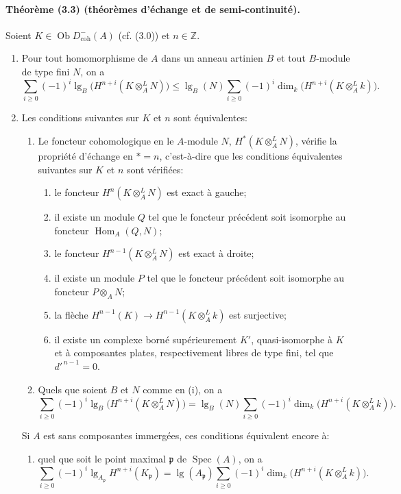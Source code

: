 \documentclass[10pt]{article}
\newcommand{\Z}{\mathbb Z}
\newcommand{\Hom}{\operatorname{Hom}}
\providecommand{\Spec}{\operatorname{Spec}}
\providecommand{\lgop}{\operatorname{lg}}
\providecommand{\Ob}{\operatorname{Ob}}
\begin{document}
\paragraph{Théorème (3.3) (théorèmes d'échange et de semi-continuité).} Soient $K\in\Ob D^-_{\mathrm{coh}}(A)$ (cf. (3.0)) et $n\in\Z$.
\begin{enumerate}[label=(\roman*)]
\item Pour tout homomorphisme de $A$ dans un anneau artinien $B$ et tout $B$-module de type fini $N$, on a
\[
\tag{3.3.1}
\sum_{i\ge0}(-1)^i\lgop_B\bigl(H^{n+i}(K\otimes_A^L N)\bigr)
\le
\lgop_B(N)\sum_{i\ge0}(-1)^i\dim_k\bigl(H^{n+i}(K\otimes_A^L k)\bigr).
\]
\item Les conditions suivantes sur $K$ et $n$ sont équivalentes:
\begin{enumerate}[label=\alph*)]
\item Le foncteur cohomologique en le $A$-module $N$, $H^*(K\otimes_A^L N)$, vérifie la propriété d'échange en $*=n$, c'est-à-dire que les conditions équivalentes suivantes sur $K$ et $n$ sont vérifiées:
\begin{enumerate}[label=a.\arabic*)]
\item le foncteur $H^n(K\otimes_A^L N)$ est exact à gauche;
\item il existe un module $Q$ tel que le foncteur précédent soit isomorphe au foncteur $\Hom_A(Q,N)$;
\item le foncteur $H^{n-1}(K\otimes_A^L N)$ est exact à droite;
\item il existe un module $P$ tel que le foncteur précédent soit isomorphe au foncteur $P\otimes_A N$;
\item la flèche $H^{n-1}(K)\to H^{n-1}(K\otimes_A^L k)$ est surjective;
\item il existe un complexe borné supérieurement $K'$, quasi-isomorphe à $K$ et à composantes plates, respectivement libres de type fini, tel que $d'^{\,n-1}=0$.
\end{enumerate}
\item Quels que soient $B$ et $N$ comme en (i), on a
\[
\tag{3.3.2}
\sum_{i\ge0}(-1)^i\lgop_B\bigl(H^{n+i}(K\otimes_A^L N)\bigr)
=
\lgop_B(N)\sum_{i\ge0}(-1)^i\dim_k\bigl(H^{n+i}(K\otimes_A^L k)\bigr).
\]
\end{enumerate}
Si $A$ est sans composantes immergées, ces conditions équivalent encore à:
\begin{enumerate}[label=\alph*),start=3]
\item quel que soit le point maximal $\mathfrak p$ de $\Spec(A)$, on a
\[
\tag{3.3.2'}
\sum_{i\ge0}(-1)^i\lgop_{A_\mathfrak p} H^{n+i}(K_\mathfrak p)=
\lgop(A_\mathfrak p)\sum_{i\ge0}(-1)^i\dim_k\bigl(H^{n+i}(K\otimes_A^L k)\bigr).
\]
\end{enumerate}
\end{enumerate}
\end{document}

